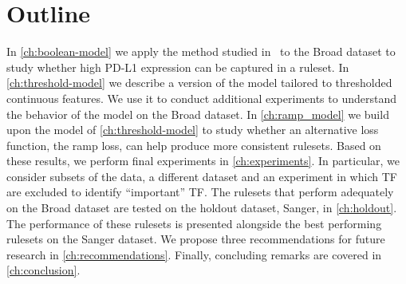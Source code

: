 \section{Outline}\label{sec:outline}
In \autoref{ch:boolean-model} we apply the method studied in~\cite{lawless_interpretable_2023} to
the Broad dataset to study whether high PD-L1 expression can be captured in a ruleset.
In \autoref{ch:threshold-model} we describe a version of the model tailored to thresholded continuous
features.
We use it to conduct additional experiments to understand the behavior of the model on the Broad dataset.
In \autoref{ch:ramp_model} we build upon the model of \autoref{ch:threshold-model} to study
whether an alternative loss function, the ramp loss, can help produce more consistent rulesets.
Based on these results, we perform final experiments in \autoref{ch:experiments}.
In particular, we consider subsets of the data, a different dataset and an experiment in which TF are excluded
to identify ``important'' TF\@.
The rulesets that perform adequately on the Broad dataset are tested on the holdout dataset,
Sanger, in \autoref{ch:holdout}.
The performance of these rulesets is presented alongside the best performing rulesets on the Sanger dataset.
We propose three recommendations for future research in \autoref{ch:recommendations}.
Finally, concluding remarks are covered in \autoref{ch:conclusion}.
